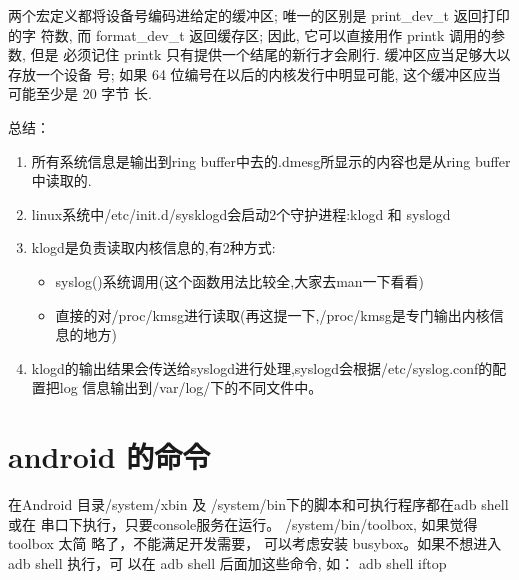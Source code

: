 \documentclass[a4paper,titlepage]{article}
\begin{document}
两个宏定义都将设备号编码进给定的缓冲区; 唯一的区别是 print_dev_t 返回打印的字
符数, 而 format_dev_t 返回缓存区; 因此, 它可以直接用作 printk 调用的参数, 但是
必须记住 printk 只有提供一个结尾的新行才会刷行. 缓冲区应当足够大以存放一个设备
号; 如果 64 位编号在以后的内核发行中明显可能, 这个缓冲区应当可能至少是 20 字节
长.

总结：

\begin{enumerate}
    \item 所有系统信息是输出到ring buffer中去的.dmesg所显示的内容也是从ring buffer中读取的. 
    \item linux系统中/etc/init.d/sysklogd会启动2个守护进程:klogd 和 syslogd 
    \item klogd是负责读取内核信息的,有2种方式: 
        \begin{itemize}
            \item syslog()系统调用(这个函数用法比较全,大家去man一下看看) 
            \item 直接的对/proc/kmsg进行读取(再这提一下,/proc/kmsg是专门输出内核信息的地方)
        \end{itemize}
    \item klogd的输出结果会传送给syslogd进行处理,syslogd会根据/etc/syslog.conf的配置把log 
信息输出到/var/log/下的不同文件中。
\end{enumerate}
\section{android 的命令}
在Android 目录/system/xbin 及 /system/bin下的脚本和可执行程序都在adb shell或在
串口下执行，只要console服务在运行。 /system/bin/toolbox, 如果觉得toolbox 太简
略了，不能满足开发需要， 可以考虑安装 busybox。如果不想进入 adb shell 执行，可
以在 adb shell 后面加这些命令, 如： adb shell iftop
\end{document}
